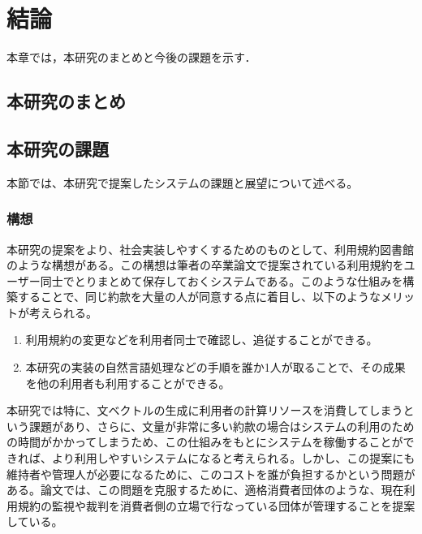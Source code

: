 \chapter{結論}
\label{conclusion}

本章では，本研究のまとめと今後の課題を示す．

\section{本研究のまとめ}

\section{本研究の課題}
本節では、本研究で提案したシステムの課題と展望について述べる。

\subsection{構想}
本研究の提案をより、社会実装しやすくするためのものとして、利用規約図書館のような構想がある。この構想は筆者の卒業論文で提案されている利用規約をユーザー同士でとりまとめて保存しておくシステムである。このような仕組みを構築することで、同じ約款を大量の人が同意する点に着目し、以下のようなメリットが考えられる。
\begin{enumerate}
  \item 利用規約の変更などを利用者同士で確認し、追従することができる。
  \item 本研究の実装の自然言語処理などの手順を誰か1人が取ることで、その成果を他の利用者も利用することができる。
\end{enumerate}
本研究では特に、文ベクトルの生成に利用者の計算リソースを消費してしまうという課題があり、さらに、文量が非常に多い約款の場合はシステムの利用のための時間がかかってしまうため、この仕組みをもとにシステムを稼働することができれば、より利用しやすいシステムになると考えられる。しかし、この提案にも維持者や管理人が必要になるために、このコストを誰が負担するかという問題がある。論文では、この問題を克服するために、適格消費者団体のような、現在利用規約の監視や裁判を消費者側の立場で行なっている団体が管理することを提案している。 


